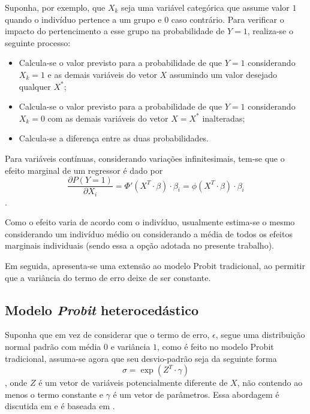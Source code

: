 \documentclass[12pt,
               openright,
               oneside,
               a4paper,
							 section=TITLE,     %
               subsection=Title,  %
               english,brazil]{article}
\begin{document}
Suponha, por exemplo, que $X_k$ seja uma variável categórica que assume valor $1$ quando o indivíduo pertence a um grupo e $0$ caso contrário. Para verificar o impacto do pertencimento a esse grupo na probabilidade de $Y=1$, realiza-se o seguinte processo: 
\begin{itemize} \item Calcula-se o valor previsto para a probabilidade de que $Y=1$ considerando $X_k=1$ e as demais variáveis do vetor $X$ assumindo um valor desejado qualquer $X^*$; 

\item Calcula-se o valor previsto para a probabilidade de que $Y=1$ considerando $X_k=0$ com as demais variáveis do vetor $X=X^*$ inalteradas; 

\item Calcula-se a diferença entre as duas probabilidades. \end{itemize}

Para variáveis contínuas, considerando variações infinitesimais, tem-se que o efeito marginal de um regressor é dado por 
$$ \frac{\partial P(Y=1) }{\partial X_i} = \Phi'(X^T \cdot \beta) \cdot \beta_i = \phi(X^T \cdot \beta) \cdot \beta_i $$. 

Como o efeito varia de acordo com o indivíduo, usualmente estima-se o mesmo considerando um indivíduo médio ou considerando a média de todos os efeitos marginais individuais (sendo essa a opção adotada no presente trabalho).

Em seguida, apresenta-se uma extensão ao modelo Probit tradicional, ao permitir que a variância do termo de erro deixe de ser constante.

\subsection{Modelo \textit{Probit} heterocedástico}

Suponha que em vez de considerar que o termo de erro, $\epsilon$, segue uma distribuição normal padrão com média $0$ e variância $1$, como é feito no modelo Probit tradicional, assuma-se agora que seu desvio-padrão seja da seguinte forma
\begin{equation}
\sigma = \exp(Z^T \cdot \gamma)
\end{equation}
, onde $Z$ é um vetor de variáveis potencialmente diferente de $X$, não contendo ao menos o termo constante e $\gamma$ é um vetor de parâmetros. Essa abordagem é discutida em  e é baseada em \cite{Harvey1976}.
\end{document}
